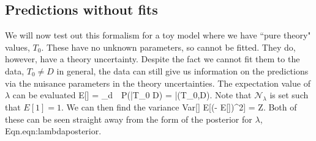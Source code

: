 \subsection{Predictions without fits}
We will now test out this formalism for a toy model where we have ``pure theory" values, $T_0$. These have no unknown parameters, so cannot be fitted. They do, however, have a theory uncertainty. Despite the fact we cannot fit them to the data, $T_0 \neq D$ in general, the data can still give us information on the predictions via the nuisance parameters in the theory uncertainties. The expectation value of $\lambda$ can be evaluated 
\be
E[\lambda] = _\lambda \int d\lambda \ \lambda\ P(\lambda |T_0 D) = \bar{\lambda}(T_0,D).
\ee
Note that $\mathcal{N}_\lambda$ is set such that $E[1]=1$. We can then find the variance
\be 
Var[\lambda] \equiv E[(\lambda - E[\lambda])^2] = Z.
\ee
Both of these can be seen straight away from the form of the posterior for $\lambda$, Eqn.{eqn:lambdaposterior}.

